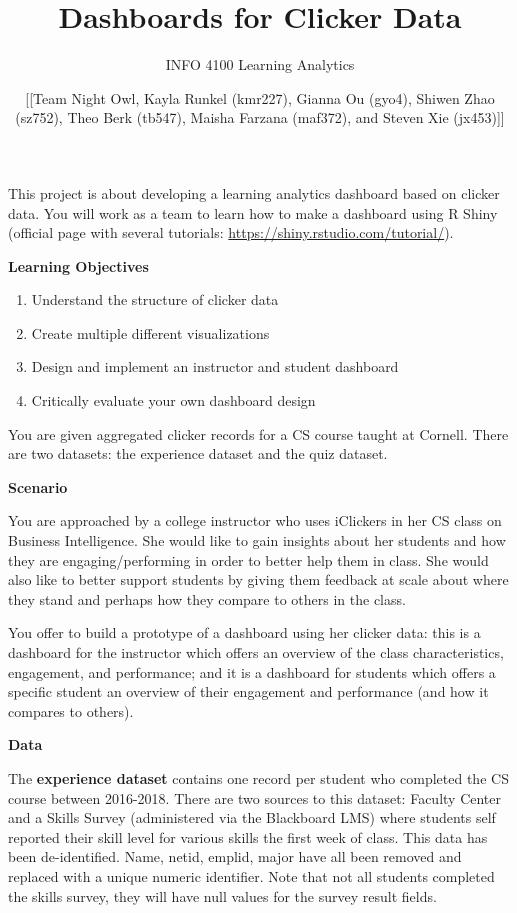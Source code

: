 \documentclass[
]{article}
\title{Dashboards for Clicker Data}
\subtitle{INFO 4100 Learning Analytics}
\author{{[}{[}Team Night Owl, Kayla Runkel (kmr227), Gianna Ou (gyo4),
Shiwen Zhao (sz752), Theo Berk (tb547), Maisha Farzana (maf372), and
Steven Xie (jx453){]}{]}}
\date{}
\providecommand{\tightlist}{%
  \setlength{\itemsep}{0pt}\setlength{\parskip}{0pt}}
\begin{document}
\maketitle

This project is about developing a learning analytics dashboard based on
clicker data. You will work as a team to learn how to make a dashboard
using R Shiny (official page with several tutorials:
\url{https://shiny.rstudio.com/tutorial/}).

\textbf{Learning Objectives}

\begin{enumerate}
\def\labelenumi{\arabic{enumi}.}
\tightlist
\item
  Understand the structure of clicker data
\item
  Create multiple different visualizations
\item
  Design and implement an instructor and student dashboard
\item
  Critically evaluate your own dashboard design
\end{enumerate}

You are given aggregated clicker records for a CS course taught at
Cornell. There are two datasets: the experience dataset and the quiz
dataset.

\textbf{Scenario}

You are approached by a college instructor who uses iClickers in her CS
class on Business Intelligence. She would like to gain insights about
her students and how they are engaging/performing in order to better
help them in class. She would also like to better support students by
giving them feedback at scale about where they stand and perhaps how
they compare to others in the class.

You offer to build a prototype of a dashboard using her clicker data:
this is a dashboard for the instructor which offers an overview of the
class characteristics, engagement, and performance; and it is a
dashboard for students which offers a specific student an overview of
their engagement and performance (and how it compares to others).

\textbf{Data}

The \textbf{experience dataset} contains one record per student who
completed the CS course between 2016-2018. There are two sources to this
dataset: Faculty Center and a Skills Survey (administered via the
Blackboard LMS) where students self reported their skill level for
various skills the first week of class. This data has been
de-identified. Name, netid, emplid, major have all been removed and
replaced with a unique numeric identifier. Note that not all students
completed the skills survey, they will have null values for the survey
result fields.
\end{document}
